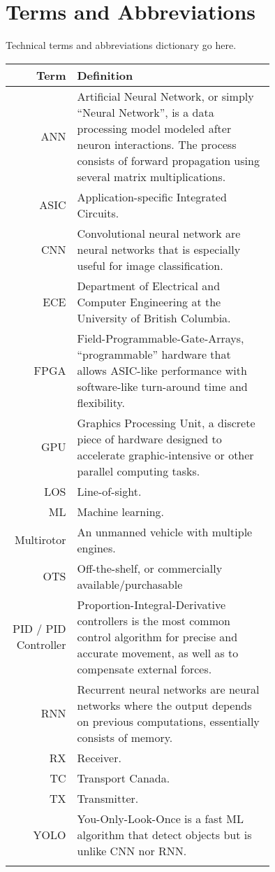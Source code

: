 \thispagestyle{empty}

\section*{Terms and Abbreviations}

Technical terms and abbreviations dictionary go here.

\begin{tabular}[h]{rp{0.75\linewidth}}
    \hline
    \textbf{Term} & \textbf{Definition}\\
    \hline

    ANN & Artificial Neural Network, or simply ``Neural Network'', is a data processing model modeled after neuron interactions. The process consists of forward propagation using several matrix multiplications.\cite{ann}\\
    ASIC & Application-specific Integrated Circuits.\\
    CNN & Convolutional neural network are neural networks that is especially useful for image classification.\cite{cnn} \\
    ECE & Department of Electrical and Computer Engineering at the University of British Columbia.\\
    FPGA & Field-Programmable-Gate-Arrays, ``programmable'' hardware that allows ASIC-like performance with software-like turn-around time and flexibility.\\
    GPU & Graphics Processing Unit, a discrete piece of hardware designed to accelerate graphic-intensive or other parallel computing tasks.\\
    LOS & Line-of-sight.\\
    ML & Machine learning.\\
    Multirotor & An unmanned vehicle with multiple engines. \\
    OTS & Off-the-shelf, or commercially available/purchasable \\
    PID / PID Controller & Proportion-Integral-Derivative controllers is the most common control algorithm for precise and accurate movement, as well as to compensate external forces.\cite{pid}\\
    RNN & Recurrent neural networks are neural networks where the output depends on previous computations, essentially consists of memory.\cite{rnn}\\
    RX & Receiver.\\
    TC & Transport Canada.\\
    TX & Transmitter.\\
    YOLO & You-Only-Look-Once is a fast ML algorithm that detect objects but is unlike CNN nor RNN.\cite{yolo}\cite{yolo-2}\\
     & \\

    \hline

\end{tabular}
